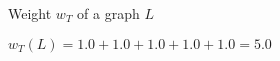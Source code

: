 \documentclass{beamer}
\newcommand{\graphbox}[8]{
  \begin{scope}[xshift=#2,yshift=#3]
    \draw [rounded corners=2mm] (0,0) rectangle (#4,-#5);
    \node at (0,0mm) [anchor=north west,inner sep=1mm] {#1};
    \begin{scope}[xshift=#4/2+#6,yshift=#7] 
    #8
    \end{scope}
  \end{scope}
}
\begin{document}
\begin{frame}{Weight $w_T$ of a graph $L$}
      
      $w_T(L) = 1.0 + 1.0 + 1.0 + 1.0 + 1.0 = 5.0$
\end{frame}
\end{document}
